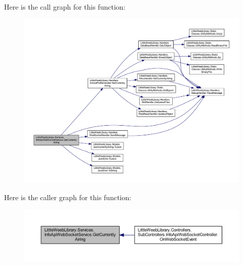 Here is the call graph for this function\+:\nopagebreak
\begin{figure}[H]
\begin{center}
\leavevmode
\includegraphics[width=350pt]{class_little_weeb_library_1_1_services_1_1_info_api_web_socket_service_aec42147d67551cb17c458453ef40f3bc_cgraph}
\end{center}
\end{figure}
Here is the caller graph for this function\+:\nopagebreak
\begin{figure}[H]
\begin{center}
\leavevmode
\includegraphics[width=350pt]{class_little_weeb_library_1_1_services_1_1_info_api_web_socket_service_aec42147d67551cb17c458453ef40f3bc_icgraph}
\end{center}
\end{figure}
\mbox{\label{class_little_weeb_library_1_1_services_1_1_info_api_web_socket_service_a71d24528e1dd2c138abed9778e9cc761}} 
